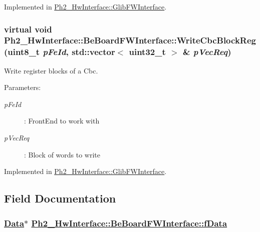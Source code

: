 Implemented in \hyperlink{class_ph2___hw_interface_1_1_glib_f_w_interface_d980b1ab04d9f87f1a26978201e42997}{Ph2\_\-Hw\-Interface::Glib\-FWInterface}.\hypertarget{class_ph2___hw_interface_1_1_be_board_f_w_interface_9cc424d15f9f0fc310279377c2916654}{
\subsubsection[WriteCbcBlockReg]{\setlength{\rightskip}{0pt plus 5cm}virtual void Ph2\_\-Hw\-Interface::Be\-Board\-FWInterface::Write\-Cbc\-Block\-Reg (uint8\_\-t {\em p\-Fe\-Id}, std::vector$<$ uint32\_\-t $>$ \& {\em p\-Vec\-Req})}}
\label{class_ph2___hw_interface_1_1_be_board_f_w_interface_9cc424d15f9f0fc310279377c2916654}


Write register blocks of a Cbc. 

\begin{Desc}
\item[Parameters:]
\begin{description}
\item[{\em p\-Fe\-Id}]: Front\-End to work with \item[{\em p\-Vec\-Req}]: Block of words to write \end{description}
\end{Desc}


Implemented in \hyperlink{class_ph2___hw_interface_1_1_glib_f_w_interface_2bc165eebeab754425dcbffb21aa2717}{Ph2\_\-Hw\-Interface::Glib\-FWInterface}.

\subsection{Field Documentation}
\hypertarget{class_ph2___hw_interface_1_1_be_board_f_w_interface_9b315d4b61df34d093ed35cfef755a0f}{
\subsubsection[fData]{\setlength{\rightskip}{0pt plus 5cm}\hyperlink{class_ph2___hw_interface_1_1_data}{Data}$\ast$ \hyperlink{class_ph2___hw_interface_1_1_be_board_f_w_interface_9b315d4b61df34d093ed35cfef755a0f}{Ph2\_\-Hw\-Interface::Be\-Board\-FWInterface::f\-Data}}}
\label{class_ph2___hw_interface_1_1_be_board_f_w_interface_9b315d4b61df34d093ed35cfef755a0f}


